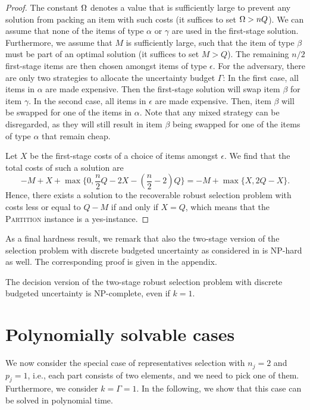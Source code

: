 \begin{proof}
The constant $\Omega$ denotes a value that is sufficiently large to prevent any solution from packing an item with such costs (it suffices to set $\Omega > nQ$).
We can assume that none of the items of type $\alpha$ or $\gamma$ are used in the first-stage solution. Furthermore, we assume that $M$ is sufficiently large, such that the item of type $\beta$ must be part of an optimal solution (it suffices to set $M > Q$). The remaining $n/2$ first-stage items are then chosen amongst items of type $\epsilon$. For the adversary, there are only two strategies to allocate the uncertainty budget $\Gamma$: In the first case, all items in $\alpha$ are made expensive. Then the first-stage solution will swap item $\beta$ for item $\gamma$. In the second case, all items in $\epsilon$ are made expensive. Then, item $\beta$ will be swapped for one of the items in $\alpha$. Note that any mixed strategy can be disregarded, as they will still result in item $\beta$ being swapped for one of the items of type $\alpha$ that remain cheap.

Let $X$ be the first-stage costs of a choice of items amongst $\epsilon$. We find that the total costs of such a solution are
\[ -M + X + \max\{ 0, \frac{n}{2}Q-2X-(\frac{n}{2}-2)Q\} = -M + \max\{ X, 2Q-X\}. \]
Hence, there exists a solution to the recoverable robust selection problem with costs less or equal to $Q-M$ if and only if $X=Q$, which means that the \textsc{Partition} instance is a yes-instance.

\end{proof}

As a final hardness result, we remark that also the two-stage version of the selection problem with discrete budgeted uncertainty as considered in \cite{chassein2018recoverable} is NP-hard as well. The corresponding proof is given in the appendix.

\begin{theorem}\label{th:hardness3}
The decision version of the two-stage robust selection problem with discrete budgeted uncertainty is NP-complete, even if $k=1$.
\end{theorem}


\section{Polynomially solvable cases}

\label{sec:special}

We now consider the special case of representatives selection with $n_j=2$ and $p_j=1$, i.e., each part consists of two elements, and we need to pick one of them. Furthermore, we consider $k=\Gamma=1$. In the following, we show that this case can be solved in polynomial time. 

